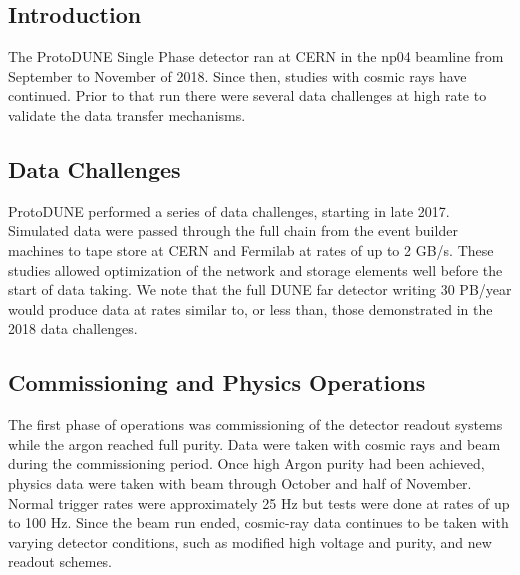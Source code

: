 \subsection{Introduction}

The ProtoDUNE Single Phase detector ran at CERN in the np04 beamline from September to November of 2018. Since then, studies with cosmic rays have continued. Prior to that run there were several data challenges at high rate to validate the data transfer mechanisms. 

\subsection{Data Challenges}

ProtoDUNE performed a series of data challenges, starting in late 2017.  Simulated data were passed through the full chain from the event builder machines to tape store at CERN and Fermilab at rates of up to 2 GB/s.  These studies allowed optimization of the network and storage elements well before the start of data taking.
We note that the full DUNE far detector writing 30 PB/year would produce data at rates similar to, or less than, those demonstrated in the 2018 data challenges. 

\subsection{Commissioning and Physics Operations}

The first phase of operations was commissioning of the detector readout systems while the argon reached full purity.  Data were taken with cosmic rays and beam during the commissioning period. Once high Argon purity had been achieved, physics data were  taken with beam through October and half of November. Normal trigger rates were approximately 25 Hz but tests were done at rates of up to 100 Hz. Since the beam run ended, cosmic-ray data continues to be taken with varying detector conditions, such as modified high voltage and purity, and new readout schemes. 



